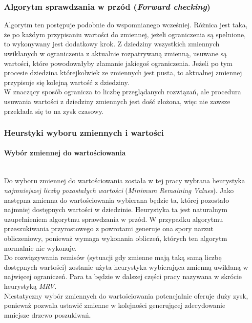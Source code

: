 \documentclass{article}
\begin{document}
	\subsubsection{Algorytm sprawdzania w przód (\textit{Forward checking})}
	Algorytm ten postępuje podobnie do wspomnianego wcześniej. Różnica jest taka, że po każdym przypisaniu wartości do zmiennej, jeżeli ograniczenia są spełnione, to wykonywany jest dodatkowy krok. Z dziedziny wszystkich zmiennych uwikłanych w ograniczenia z aktualnie rozpatrywaną zmienną, usuwane są wartości, które powodowałyby złamanie jakiegoś ograniczenia. Jeżeli po tym procesie dziedzina którejkolwiek ze zmiennych jest pusta, to aktualnej zmiennej przypisuje się kolejną wartość z dziedziny.\\
	W znaczący sposób ogranicza to liczbę przeglądanych rozwiązań, ale procedura usuwania wartości z dziedziny zmiennych jest dość złożona, więc nie zawsze przekłada się to na zysk czasowy. 
	
	\subsubsection{Heurstyki wyboru zmiennych i wartości}
	\paragraph{Wybór zmiennej do wartościowania}\mbox{}\\
	Do wyboru zmiennej do wartościowania została w tej pracy wybrana heurystyka \textit{najmniejszej liczby pozostałych wartości} (\textit{Minimum Remaining Values}). Jako następna zmienna do wartościowania wybierana będzie ta, której pozostało najmniej dostępnych wartości w dziedzinie. Heurystyka ta jest naturalnym uzupełnieniem algorytmu sprawdzania w przód. W przypadku algorytmu przeszukiwania przyrostowego z powrotami generuje ona spory narzut obliczeniowy, ponieważ wymaga wykonania obliczeń, których ten algorytm normalnie nie wykonuje.\\
	Do rozwiązywania remisów (sytuacji gdy zmienne mają taką samą liczbę dostępnych wartości) zostanie użyta heurystyka wybierająca zmienną uwikłaną w najwięcej ograniczeń. Para ta będzie w dalszej części pracy nazywana w skrócie heurystyką \textit{MRV}.\\
	Niestatyczny wybór zmiennych do wartościowania potencjalnie oferuje duży zysk, ponieważ pozwala ustawić zmienne w kolejności generującej zdecydowanie mniejsze drzewo poszukiwań.
\end{document}
